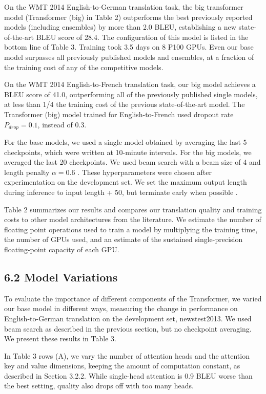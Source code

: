 \documentclass[12pt, a4paper]{article}
\begin{document}
On the WMT 2014 English-to-German translation task, the big transformer model (Transformer (big) in Table 2) outperforms the best previously reported models (including ensembles) by more than 2.0 BLEU, establishing a new state-of-the-art BLEU score of 28.4. The configuration of this model is listed in the bottom line of Table 3. Training took 3.5 days on 8 P100 GPUs. Even our base model surpasses all previously published models and ensembles, at a fraction of the training cost of any of the competitive models.

On the WMT 2014 English-to-French translation task, our big model achieves a BLEU score of 41.0, outperforming all of the previously published single models, at less than 1/4 the training cost of the previous state-of-the-art model. The Transformer (big) model trained for English-to-French used dropout rate $P_{drop} = 0.1$, instead of 0.3.

For the base models, we used a single model obtained by averaging the last 5 checkpoints, which were written at 10-minute intervals. For the big models, we averaged the last 20 checkpoints. We used beam search with a beam size of 4 and length penalty $\alpha = 0.6$ \cite{ref38}. These hyperparameters were chosen after experimentation on the development set. We set the maximum output length during inference to input length + 50, but terminate early when possible \cite{ref38}.

Table 2 summarizes our results and compares our translation quality and training costs to other model architectures from the literature. We estimate the number of floating point operations used to train a model by multiplying the training time, the number of GPUs used, and an estimate of the sustained single-precision floating-point capacity of each GPU.

\subsection{6.2 Model Variations}

To evaluate the importance of different components of the Transformer, we varied our base model in different ways, measuring the change in performance on English-to-German translation on the development set, newstest2013. We used beam search as described in the previous section, but no checkpoint averaging. We present these results in Table 3.

In Table 3 rows (A), we vary the number of attention heads and the attention key and value dimensions, keeping the amount of computation constant, as described in Section 3.2.2. While single-head attention is 0.9 BLEU worse than the best setting, quality also drops off with too many heads.
\end{document}
